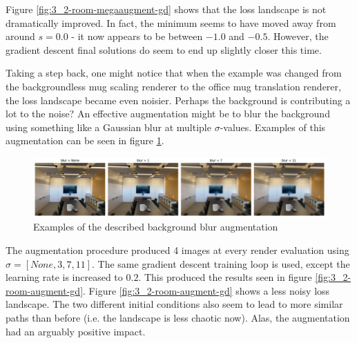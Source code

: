 Figure \ref{fig:3_2-room-megaaugment-gd} shows that the loss landscape is not dramatically improved. In fact, the minimum seems to have moved away from around $s=0.0$ - it now appears to be between $-1.0$ and $-0.5$. However, the gradient descent final solutions do seem to end up slightly closer this time.


Taking a step back, one might notice that when the example was changed from the backgroundless mug scaling renderer to the office mug translation renderer, the loss landscape became even noisier. Perhaps the background is contributing a lot to the noise? An effective augmentation might be to blur the background using something like a Gaussian blur at multiple $\sigma$-values. Examples of this augmentation can be seen in figure \ref{fig:3_2-blur-examples}.
\begin{figure}[H]
    \centering
    \includegraphics[width=1.0\textwidth]{figures/3_2-blur-examples.pdf}
    \caption{Examples of the described background blur augmentation}
    \label{fig:3_2-blur-examples}
\end{figure}


The augmentation procedure produced 4 images at every render evaluation using $\sigma=[None, 3, 7, 11]$. The same gradient descent training loop is used, except the learning rate is increased to $0.2$. This produced the results seen in figure \ref{fig:3_2-room-augment-gd}.
Figure \ref{fig:3_2-room-augment-gd} shows a less noisy loss landscape. The two different initial conditions also seem to lead to more similar paths than before (i.e. the landscape is less chaotic now). Alas, the augmentation had an arguably positive impact.

